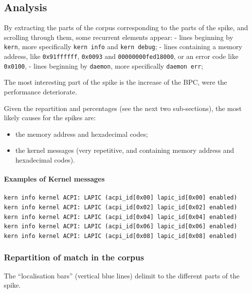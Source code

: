 \subsection{Analysis}

By extracting the parts of the corpus corresponding to the parts of the
spike, and scrolling through them, some recurrent elements appear: -
lines beginning by \lstinline!kern!, more specifically
\lstinline!kern info! and \lstinline!kern debug!; - lines containing a
memory address, like \lstinline!0x91ffffff!, \lstinline!0x0093! and
\lstinline!00000000fed18000!, or an error code like \lstinline!0x0100!,
- lines beginning by \lstinline!daemon!, more specifically
\lstinline!daemon err!;

The most interesting part of the spike is the increase of the BPC, were
the performance deteriorate.

Given the repartition and percentages (see the next two sub-sections),
the most likely causes for the spikes are:
\begin{itemize}
\item the memory address and
hexadecimal codes;
\item the kernel messages (very repetitive, and
containing memory address and hexadecimal codes).
\end{itemize}

\paragraph{Examples of Kernel
messages}

\begin{lstlisting}
kern info kernel ACPI: LAPIC (acpi_id[0x00] lapic_id[0x00] enabled)
kern info kernel ACPI: LAPIC (acpi_id[0x02] lapic_id[0x02] enabled)
kern info kernel ACPI: LAPIC (acpi_id[0x04] lapic_id[0x04] enabled)
kern info kernel ACPI: LAPIC (acpi_id[0x06] lapic_id[0x06] enabled)
kern info kernel ACPI: LAPIC (acpi_id[0x08] lapic_id[0x08] enabled)
\end{lstlisting}

\subsubsection{Repartition of match in the
corpus}

The ``localisation bars'' (vertical blue lines) delimit to the different
parts of the spike.

